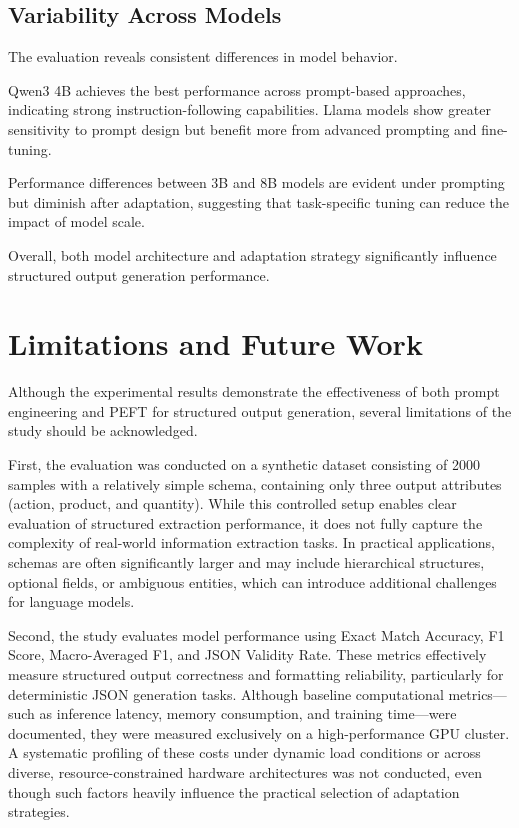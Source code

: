 \documentclass[journal,article,submit,pdftex,moreauthors]{Definitions/mdpi}
\begin{document}
\subsection{Variability Across Models}
The evaluation reveals consistent differences in model behavior.

Qwen3 4B achieves the best performance across prompt-based approaches, indicating strong instruction-following capabilities. Llama models show greater sensitivity to prompt design but benefit more from advanced prompting and fine-tuning.

Performance differences between 3B and 8B models are evident under prompting but diminish after adaptation, suggesting that task-specific tuning can reduce the impact of model scale.

Overall, both model architecture and adaptation strategy significantly influence structured output generation performance.

\section{Limitations and Future Work}

Although the experimental results demonstrate the effectiveness of both prompt engineering and PEFT for structured output generation, several limitations of the study should be acknowledged.

First, the evaluation was conducted on a synthetic dataset consisting of 2000 samples with a relatively simple schema, containing only three output attributes (action, product, and quantity). While this controlled setup enables clear evaluation of structured extraction performance, it does not fully capture the complexity of real-world information extraction tasks. In practical applications, schemas are often significantly larger and may include hierarchical structures, optional fields, or ambiguous entities, which can introduce additional challenges for language models.

Second, the study evaluates model performance using Exact Match Accuracy, F1 Score, Macro-Averaged F1, and JSON Validity Rate. These metrics effectively measure structured output correctness and formatting reliability, particularly for deterministic JSON generation tasks. Although baseline computational metrics—such as inference latency, memory consumption, and training time—were documented, they were measured exclusively on a high-performance GPU cluster. A systematic profiling of these costs under dynamic load conditions or across diverse, resource-constrained hardware architectures was not conducted, even though such factors heavily influence the practical selection of adaptation strategies.
\end{document}
